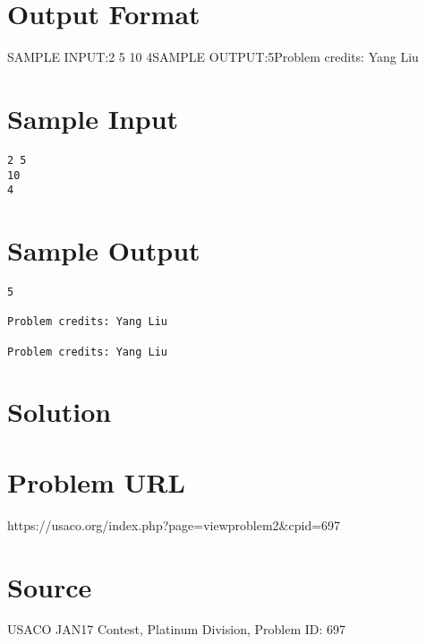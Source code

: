 \documentclass[12pt]{article}
\begin{document}
\section*{Output Format}
SAMPLE INPUT:2 5
10
4SAMPLE OUTPUT:5Problem credits: Yang Liu

\section*{Sample Input}
\begin{verbatim}
2 5
10
4
\end{verbatim}

\section*{Sample Output}
\begin{verbatim}
5

Problem credits: Yang Liu

Problem credits: Yang Liu
\end{verbatim}

\section*{Solution}


\section*{Problem URL}
https://usaco.org/index.php?page=viewproblem2&cpid=697

\section*{Source}
USACO JAN17 Contest, Platinum Division, Problem ID: 697
\end{document}
